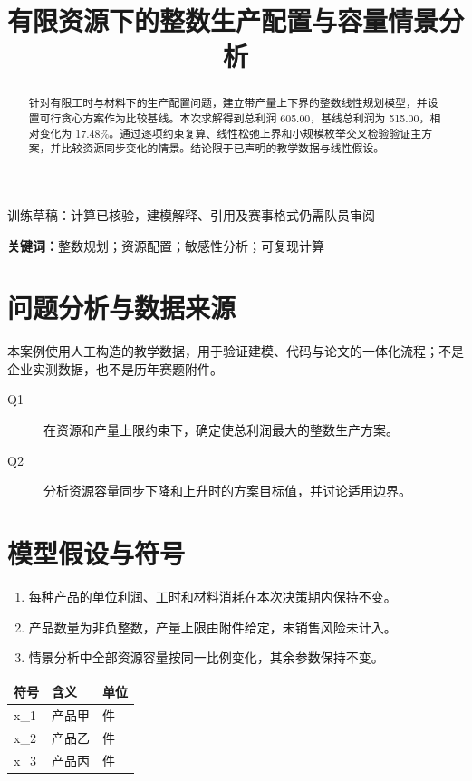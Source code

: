 \documentclass[UTF8,a4paper,11pt,fontset=fandol]{ctexart}
\title{\bfseries 有限资源下的整数生产配置与容量情景分析}
\author{}
\date{}
\begin{document}
\maketitle
\vspace{-2.4em}
\begin{center}\small\color{accent}训练草稿：计算已核验，建模解释、引用及赛事格式仍需队员审阅\end{center}
\begin{abstract}
针对有限工时与材料下的生产配置问题，建立带产量上下界的整数线性规划模型，并设置可行贪心方案作为比较基线。本次求解得到总利润 605.00，基线总利润为 515.00，相对变化为 17.48\%。通过逐项约束复算、线性松弛上界和小规模枚举交叉检验验证主方案，并比较资源同步变化的情景。结论限于已声明的教学数据与线性假设。
\end{abstract}
\noindent\textbf{关键词：}整数规划；资源配置；敏感性分析；可复现计算

\section{问题分析与数据来源}
本案例使用人工构造的教学数据，用于验证建模、代码与论文的一体化流程；不是企业实测数据，也不是历年赛题附件。
\begin{description}

\item[Q1] 在资源和产量上限约束下，确定使总利润最大的整数生产方案。

\item[Q2] 分析资源容量同步下降和上升时的方案目标值，并讨论适用边界。

\end{description}

\section{模型假设与符号}
\begin{enumerate}

\item 每种产品的单位利润、工时和材料消耗在本次决策期内保持不变。

\item 产品数量为非负整数，产量上限由附件给定，未销售风险未计入。

\item 情景分析中全部资源容量按同一比例变化，其余参数保持不变。

\end{enumerate}
\begin{longtable}{p{}p{}p{}}
\toprule 符号 & 含义 & 单位 \\ \midrule

x\_1 & 产品甲 & 件 \\

x\_2 & 产品乙 & 件 \\

x\_3 & 产品丙 & 件 \\

\bottomrule
\end{longtable}
\end{document}
